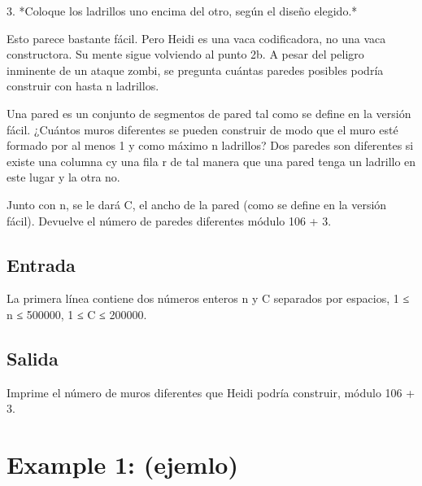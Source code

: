 \documentclass[12pt]{article}
\begin{document}
    \begin{flushleft}
        3. *Coloque los ladrillos uno encima del otro, según el diseño elegido.*
    \end{flushleft}

    \begin{flushleft}
        Esto parece bastante fácil. Pero Heidi es una vaca codificadora, no una vaca constructora. Su mente sigue volviendo al punto 2b. A pesar del peligro inminente de un ataque zombi, se pregunta cuántas paredes posibles podría construir con hasta n ladrillos.
    \end{flushleft}

    \begin{flushleft}
        Una pared es un conjunto de segmentos de pared tal como se define en la versión fácil. ¿Cuántos muros diferentes se pueden construir de modo que el muro esté formado por al menos 1 y como máximo n ladrillos? Dos paredes son diferentes si existe una columna cy una fila r de tal manera que una pared tenga un ladrillo en este lugar y la otra no.
    \end{flushleft}

    \begin{flushleft}
        Junto con n, se le dará C, el ancho de la pared (como se define en la versión fácil). Devuelve el número de paredes diferentes módulo 106 + 3.
    \end{flushleft}

    \subsection*{Entrada}

    \begin{flushleft}
        La primera línea contiene dos números enteros n y C separados por espacios, 1 ≤ n ≤ 500000, 1 ≤ C ≤ 200000.
    \end{flushleft}


    \subsection*{Salida}
    \begin{flushleft}
        Imprime el número de muros diferentes que Heidi podría construir, módulo 106 + 3.
    \end{flushleft}


    \section*{Example 1: (ejemlo)}
\end{document}
